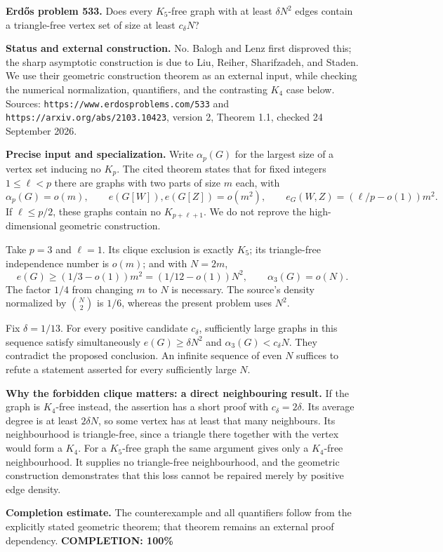 \textbf{Erd\H{o}s problem 533.}
Does every $K_5$-free graph with at least $\delta N^2$ edges contain a triangle-free vertex set of size at least $c_\delta N$?

\textbf{Status and external construction.}
No. Balogh and Lenz first disproved this; the sharp asymptotic construction is due to Liu, Reiher, Sharifzadeh, and Staden. We use their geometric construction theorem as an external input, while checking the numerical normalization, quantifiers, and the contrasting $K_4$ case below.
Sources: \texttt{https://www.erdosproblems.com/533} and
\texttt{https://arxiv.org/abs/2103.10423}, version 2, Theorem 1.1, checked 24 September 2026.

\textbf{Precise input and specialization.}
Write $\alpha_p(G)$ for the largest size of a vertex set inducing no $K_p$.
The cited theorem states that for fixed integers $1\leq\ell<p$ there are graphs with two parts of size $m$ each, with
\[
 \alpha_p(G)=o(m),\qquad e(G[W]),e(G[Z])=o(m^2),\qquad
 e_G(W,Z)=(\ell/p-o(1))m^2.
\]
If $\ell\leq p/2$, these graphs contain no $K_{p+\ell+1}$. We do not reprove the high-dimensional geometric construction.

Take $p=3$ and $\ell=1$. Its clique exclusion is exactly $K_5$; its triangle-free independence number is $o(m)$; and with $N=2m$,
\[
 e(G)\geq(1/3-o(1))m^2=(1/12-o(1))N^2,\qquad
 \alpha_3(G)=o(N).
\]
The factor $1/4$ from changing $m$ to $N$ is necessary. The source's density normalized by $\binom N2$ is $1/6$, whereas the present problem uses $N^2$.

Fix $\delta=1/13$. For every positive candidate $c_\delta$, sufficiently large graphs in this sequence satisfy simultaneously
$e(G)\geq\delta N^2$ and $\alpha_3(G)<c_\delta N$. They contradict the proposed conclusion. An infinite sequence of even $N$ suffices to refute a statement asserted for every sufficiently large $N$.

\textbf{Why the forbidden clique matters: a direct neighbouring result.}
If the graph is $K_4$-free instead, the assertion has a short proof with $c_\delta=2\delta$. Its average degree is at least $2\delta N$, so some vertex has at least that many neighbours. Its neighbourhood is triangle-free, since a triangle there together with the vertex would form a $K_4$.
For a $K_5$-free graph the same argument gives only a $K_4$-free neighbourhood. It supplies no triangle-free neighbourhood, and the geometric construction demonstrates that this loss cannot be repaired merely by positive edge density.

\textbf{Completion estimate.}
The counterexample and all quantifiers follow from the explicitly stated geometric theorem; that theorem remains an external proof dependency.
\textbf{COMPLETION: 100\%}
